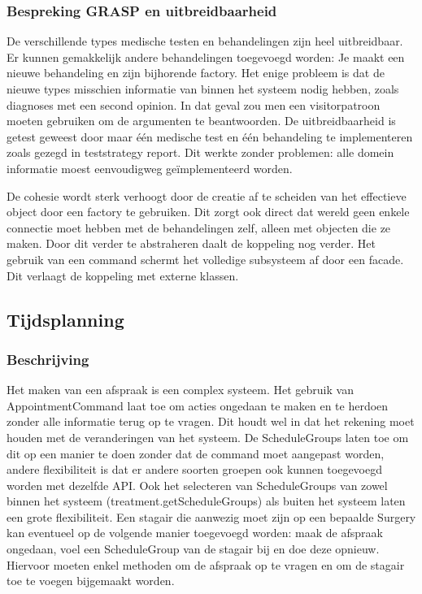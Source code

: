 \documentclass[a4paper]{article}
\begin{document}
\subsubsection{Bespreking GRASP en uitbreidbaarheid}
De verschillende types medische testen en behandelingen zijn heel uitbreidbaar. Er kunnen gemakkelijk andere behandelingen toegevoegd worden: Je maakt een nieuwe behandeling en zijn bijhorende factory. Het enige probleem is dat de nieuwe types misschien informatie van binnen het systeem nodig hebben, zoals diagnoses met een second opinion. In dat geval zou men een visitorpatroon moeten gebruiken om de argumenten te beantwoorden. De uitbreidbaarheid is getest geweest door maar één medische test en één behandeling te implementeren zoals gezegd in teststrategy report. Dit werkte zonder problemen: alle domein informatie moest eenvoudigweg geïmplementeerd worden. 

De cohesie wordt sterk verhoogt door de creatie af te scheiden van het effectieve object door een factory te gebruiken. Dit zorgt ook direct dat wereld geen enkele connectie moet hebben met de behandelingen zelf, alleen met objecten die ze maken. Door dit verder te abstraheren daalt de koppeling nog verder. Het gebruik van een command schermt het volledige subsysteem af door een facade. Dit verlaagt de koppeling met externe klassen.

\subsection{Tijdsplanning \label{sec:scheduling}}
\subsubsection{Beschrijving}
Het maken van een afspraak is een complex systeem. Het gebruik van AppointmentCommand laat toe om acties ongedaan te maken en te herdoen zonder alle informatie terug op te vragen. Dit houdt wel in dat het rekening moet houden met de veranderingen van het systeem. De ScheduleGroups laten toe om dit op een manier te doen zonder dat de command moet aangepast worden, andere flexibiliteit is dat er andere soorten groepen ook kunnen toegevoegd worden met dezelfde API. Ook het selecteren van ScheduleGroups van zowel binnen het systeem (treatment.getScheduleGroups) als buiten het systeem laten een grote flexibiliteit. Een stagair die aanwezig moet zijn op een bepaalde Surgery kan eventueel op de volgende manier toegevoegd worden: maak de afspraak ongedaan, voel een ScheduleGroup van de stagair bij en doe deze opnieuw. Hiervoor moeten enkel methoden om de afspraak op te vragen en om de stagair toe te voegen bijgemaakt worden. 
\end{document}
